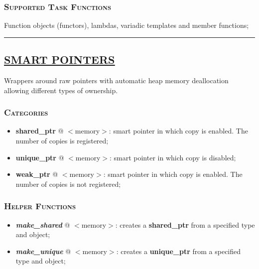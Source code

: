 \documentclass[10pt]{article}
\begin{document}
\begin{multicols*}{4}
{\subsubsection*{\textsc{Supported Task Functions}} 
\noindent
Function objects (functors), lambdas, variadic templates and member functions; 

}

\par\noindent\rule{197pt}{0.4pt}


{\color{Blue}
\subsection*{\href{https://en.cppreference.com/w/cpp/memory}{\underline{SMART POINTERS}}}	
\noindent
Wrappers around raw pointers with automatic heap memory deallocation allowing different types of ownership.

\subsubsection*{\textsc{Categories}} 
\begin{itemize}[leftmargin=*,topsep=0.25pt]
  \setlength\itemsep{-1.8pt}
	\item  {\textbf{shared\_ptr}} @ $<$memory$>$: smart pointer in which copy is enabled. The number of copies is registered;
	\item  {\textbf{unique\_ptr}} @ $<$memory$>$: smart pointer in which copy is disabled;
	\item  {\textbf{weak\_ptr}} @ $<$memory$>$: smart pointer in which copy is enabled. The number of copies is not registered;
\end{itemize}

\subsubsection*{\textsc{Helper Functions}} 
\begin{itemize}[leftmargin=*,topsep=0.25pt]
  \setlength\itemsep{-1.8pt}
	\item  \emph{\textbf{make\_shared}} @ $<$memory$>$: creates a \textbf{shared\_ptr} from a specified type and object;
	\item  \emph{\textbf{make\_unique}} @ $<$memory$>$: creates a \textbf{unique\_ptr} from a specified type and object;
\end{itemize}

}
\end{multicols*}
\end{document}

